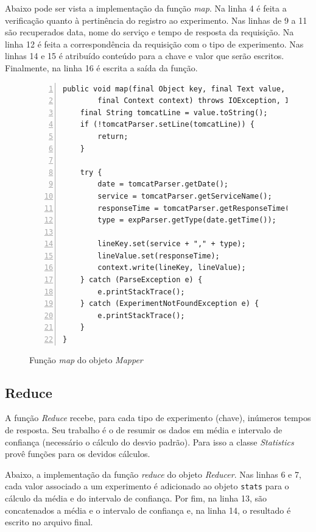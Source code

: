 \documentclass[brazil, a4paper,12pt]{article}
\begin{document}
Abaixo pode ser vista a implementação da função \emph{map}. Na linha 4 é feita
a verificação quanto à pertinência do registro ao experimento. Nas linhas de 9
a 11 são recuperados data, nome do serviço e tempo de resposta da requisição.
Na linha 12 é feita a correspondência da requisição com o tipo de experimento.
Nas linhas 14 e 15 é atribuído conteúdo para a chave e valor que serão
escritos. Finalmente, na linha 16 é escrita a saída da função.

\begin{figure} [!htb]
\begin{center}
\footnotesize
\begin{lstlisting}[numbers=left]
public void map(final Object key, final Text value,
		final Context context) throws IOException, InterruptedException {
	final String tomcatLine = value.toString();
	if (!tomcatParser.setLine(tomcatLine)) {
		return;
	}

	try {
		date = tomcatParser.getDate();
		service = tomcatParser.getServiceName();
		responseTime = tomcatParser.getResponseTime();
		type = expParser.getType(date.getTime());

		lineKey.set(service + "," + type);
		lineValue.set(responseTime);
		context.write(lineKey, lineValue);
	} catch (ParseException e) {
		e.printStackTrace();
	} catch (ExperimentNotFoundException e) {
		e.printStackTrace();
	}
}
\end{lstlisting}
\end{center}
\caption{Função \emph{map} do objeto \emph{Mapper}}
\end{figure}


\subsection{Reduce} A função \emph{Reduce} recebe, para cada tipo de
experimento (chave), inúmeros tempos de resposta.  Seu trabalho é o de resumir
os dados em média e intervalo de confiança (necessário o cálculo do desvio
    padrão). Para isso a classe \emph{Statistics} provê funções para os devidos
cálculos.

Abaixo, a implementação da função \emph{reduce} do objeto \emph{Reducer}. Nas
linhas 6 e 7, cada valor associado a um experimento é adicionado ao objeto
\verb|stats| para o cálculo da média e do intervalo de confiança. Por fim, na
linha 13, são concatenados a média e o intervalo de confiança  e, na linha 14,
      o resultado é escrito no arquivo final.
\end{document}
